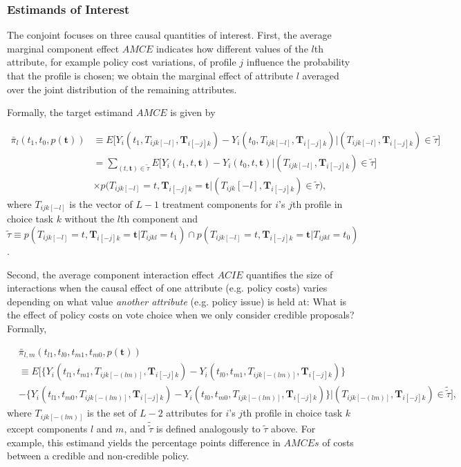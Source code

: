 \documentclass[11pt]{article}
\begin{document}
\subsubsection{Estimands of Interest}
The conjoint focuses on three causal quantities of interest. First, the average marginal component effect $AMCE$ indicates how different values of the $l$th attribute, for example policy cost variations, of profile $j$ influence the probability that the profile is chosen; we obtain the marginal effect of attribute $l$ averaged over the joint distribution of the remaining attributes.

Formally, the target estimand $AMCE$ is given by

\begin{equation}
\begin{aligned}
\bar{\pi}_l(t_1, t_0, p(\bm{t})) & \equiv E\bigg[Y_i(t_1, T_{ijk[-l]}, \bm{T}_{i[-j]k}) - Y_i(t_0, T_{ijk[-l]}, \bm{T}_{i[-j]k})|(T_{ijk[-l]}, \bm{T}_{i[-j]k}) \in \tilde{\tau}\bigg] \\
& = \sum_{(t, \bm{t}) \in \tilde{\tau}} E\bigg[Y_i(t_1, t, \bm{t}) - Y_i(t_0, t, \bm{t})|(T_{ijk[-l]}, \bm{T}_{i[-j]k}) \in \tilde{\tau}\bigg] \\
& \times p\bigg(T_{ijk[-l]} = t, \bm{T}_{i[-j]k} = \bm{t}|(T_{ijk}[-l], \bm{T}_{i[-j]k}) \in \tilde{\tau}\bigg),
\end{aligned}
\end{equation}
where $T_{ijk[-l]}$ is the vector of $L - 1$ treatment components for $i$'s $j$th profile in choice task $k$ without the $l$th component and $\tilde{\tau} \equiv p(T_{ijk[-l]} = t, \bm{T}_{i[-j]k} = \bm{t}|T_{ijkl} = t_1) \cap p(T_{ijk[-l]} = t, \bm{T}_{i[-j]k} = \bm{t}|T_{ijkl} = t_0)$.

Second, the average component interaction effect $ACIE$ quantifies the size of interactions when the causal effect of one attribute (e.g. policy costs) varies depending on what value \textit{another attribute} (e.g. policy issue) is held at: What is the effect of policy costs on vote choice when we only consider credible proposals? Formally,


\begin{align}
& \bar{\pi}_{l, m}(t_{l1}, t_{l0}, t_{m1}, t_{m0}, p(\bm{t})) \\
& \equiv E\Bigg[\bigg\{Y_i(t_{l1}, t_{m1}, T_{ijk[-(lm)]}, \bm{T}_{i[-j]k}) - Y_i(t_{l0}, t_{m1}, T_{ijk[-(lm)]}, \bm{T}_{i[-j]k})\bigg\} \nonumber \\
& - \bigg\{Y_i(t_{l1}, t_{m0}, T_{ijk[-(lm)]}, \bm{T}_{i[-j]k}) - Y_i(t_{l0}, t_{m0}, T_{ijk[-(lm)]}, \bm{T}_{i[-j]k})\bigg\} | (T_{ijk[-(lm)]}, \bm{T}_{i[-j]k}) \in \tilde{\tilde{\tau}}\Bigg] \nonumber,
\end{align}
where $T_{ijk[-(lm)]}$ is the set of $L - 2$ attributes for $i$'s $j$th profile in choice task $k$ except components $l$ and $m$, and $\tilde{\tilde{\tau}}$ is defined analogously to $\tilde{\tau}$ above. For example, this estimand yields the percentage points difference in $AMCEs$ of costs between a credible and non-credible policy.
\end{document}
